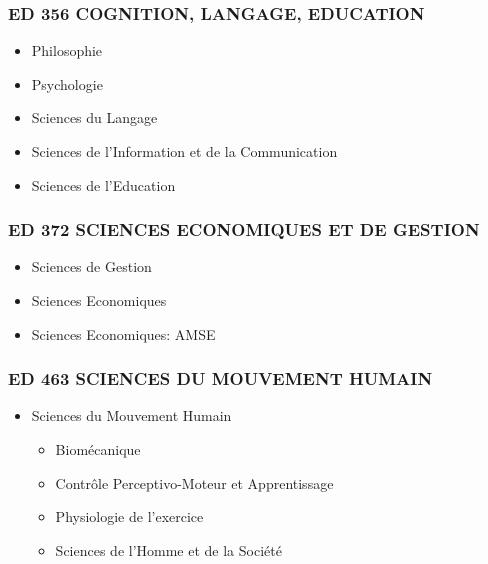 \subsubsection*{ED 356 COGNITION, LANGAGE, EDUCATION}\label{ed-356-cognition-langage-education}

\begin{itemize}
\item Philosophie
\item Psychologie
\item Sciences du Langage
\item Sciences de l'Information et de la Communication
\item Sciences de l'Education
\end{itemize}

\subsubsection*{ED 372 SCIENCES ECONOMIQUES ET DE GESTION}\label{ed-372-sciences-economiques-et-de-gestion}

\begin{itemize}
\item Sciences de Gestion
\item Sciences Economiques
\item Sciences Economiques: AMSE
\end{itemize}

\subsubsection*{ED 463 SCIENCES DU MOUVEMENT HUMAIN}\label{ed-463-sciences-du-mouvement-humain}

\begin{itemize}
\item Sciences du Mouvement Humain
\begin{itemize}
\item Biomécanique
\item Contrôle Perceptivo-Moteur et Apprentissage
\item Physiologie de l'exercice
\item Sciences de l'Homme et de la Société
\end{itemize}
\end{itemize}
